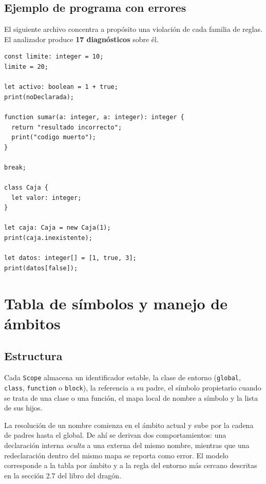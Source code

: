 \documentclass[11pt,a4paper]{article}
\begin{document}
\subsection{Ejemplo de programa con errores}

El siguiente archivo concentra a propósito una violación de cada familia de
reglas. El analizador produce \textbf{17 diagnósticos} sobre él.

\begin{lstlisting}[language=Compiscript,caption={\texttt{errores\_semanticos.cps}.}]
const limite: integer = 10;
limite = 20;

let activo: boolean = 1 + true;
print(noDeclarada);

function sumar(a: integer, a: integer): integer {
  return "resultado incorrecto";
  print("codigo muerto");
}

break;

class Caja {
  let valor: integer;
}

let caja: Caja = new Caja(1);
print(caja.inexistente);

let datos: integer[] = [1, true, 3];
print(datos[false]);
\end{lstlisting}

\section{Tabla de símbolos y manejo de ámbitos}

\subsection{Estructura}

Cada \texttt{Scope} almacena un identificador estable, la clase de entorno
(\texttt{global}, \texttt{class}, \texttt{function} o \texttt{block}), la
referencia a su padre, el símbolo propietario cuando se trata de una clase o
una función, el mapa local de nombre a símbolo y la lista de sus hijos.

La resolución de un nombre comienza en el ámbito actual y sube por la cadena de
padres hasta el global. De ahí se derivan dos comportamientos: una declaración
interna \emph{oculta} a una externa del mismo nombre, mientras que una
redeclaración dentro del mismo mapa se reporta como error. El modelo corresponde
a la tabla por ámbito y a la regla del entorno más cercano descritas en la
sección 2.7 del libro del dragón.
\end{document}
